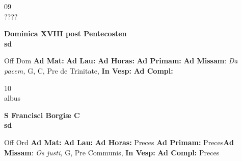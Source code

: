 \documentclass[10pt, openany]{book}
\begin{document}
    \begin{center}
        \begin{minipage}{3.5in}
            \vspace{2em}
            \begin{minipage}{0.5in}
                {\Huge 09} \\
                {\normalsize ????}
            \end{minipage}
            \begin{minipage}{3.0in}
                \textbf{ \large Dominica XVIII post Pentecosten \\
                \textnormal{\normalsize sd}}

            \end{minipage}
            \begin{justify}Off Dom
                \textbf{Ad Mat: }
                \textbf{Ad Lau: }
                \textbf{Ad Horas: }
                \textbf{Ad Primam: }\textbf{Ad Missam}: \textit{Da pacem,} G, C, Pre de Trinitate, 
                \textbf{In Vesp: }
                \textbf{Ad Compl: }
            \end{justify}
        \end{minipage}
    \end{center}

    \begin{center}
        \begin{minipage}{3.5in}
            \vspace{2em}
            \begin{minipage}{0.5in}
                {\Huge 10} \\
                {\normalsize albus}
            \end{minipage}
            \begin{minipage}{3.0in}
                \textbf{ \large S Francisci Borgiæ C \\
                \textnormal{\normalsize sd}}

            \end{minipage}
            \begin{justify}Off Ord
                \textbf{Ad Mat: }
                \textbf{Ad Lau: }
                \textbf{Ad Horas: }Preces
                \textbf{Ad Primam: }Preces\textbf{Ad Missam}: \textit{Os justi,} G, Pre Communis, 
                \textbf{In Vesp: }
                \textbf{Ad Compl: }Preces
            \end{justify}
        \end{minipage}
    \end{center}
\end{document}

